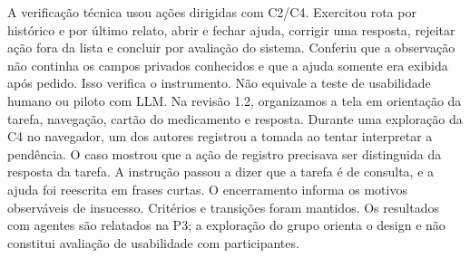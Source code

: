 A verificação técnica usou ações dirigidas com C2/C4. Exercitou rota por histórico e por último relato, abrir e fechar ajuda, corrigir uma resposta, rejeitar ação fora da lista e concluir por avaliação do sistema. Conferiu que a observação não continha os campos privados conhecidos e que a ajuda somente era exibida após pedido. Isso verifica o instrumento. Não equivale a teste de usabilidade humano ou piloto com LLM. Na revisão 1.2, organizamos a tela em orientação da tarefa, navegação, cartão do medicamento e resposta. Durante uma exploração da C4 no navegador, um dos autores registrou a tomada ao tentar interpretar a pendência. O caso mostrou que a ação de registro precisava ser distinguida da resposta da tarefa. A instrução passou a dizer que a tarefa é de consulta, e a ajuda foi reescrita em frases curtas. O encerramento informa os motivos observáveis de insucesso. Critérios e transições foram mantidos. Os resultados com agentes são relatados na P3; a exploração do grupo orienta o design e não constitui avaliação de usabilidade com participantes.

